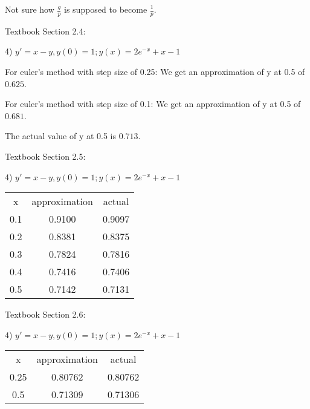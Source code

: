 \documentclass{article}
\begin{document}
Not sure how $\frac{g}{p}$ is supposed to become $\frac{1}{p}$.



Textbook Section 2.4:

4) $y' = x - y, y(0) = 1; y(x) = 2e^{-x} + x - 1$

For euler's method with step size of 0.25:
We get an approximation of y at 0.5 of $0.625$.

For euler's method with step size of 0.1:
We get an approximation of y at 0.5 of $0.681$.

The actual value of y at 0.5 is $0.713$.


Textbook Section 2.5:

4) $y' = x - y, y(0) = 1; y(x) = 2e^{-x} + x - 1$

\begin{center}
\begin{tabular}{ c c c }
    x & approximation & actual \\
    0.1 & 0.9100 & 0.9097 \\
    0.2 & 0.8381 & 0.8375 \\
    0.3 & 0.7824 & 0.7816 \\
    0.4 & 0.7416 & 0.7406 \\
    0.5 & 0.7142 & 0.7131
\end{tabular}
\end{center}



Textbook Section 2.6:

4) $y' = x - y, y(0) = 1; y(x) = 2e^{-x} + x - 1$

\begin{center}
\begin{tabular}{ c c c }
    x & approximation & actual \\
    0.25 & 0.80762 & 0.80762 \\
    0.5 & 0.71309 & 0.71306
\end{tabular}
\end{center}
\end{document}
